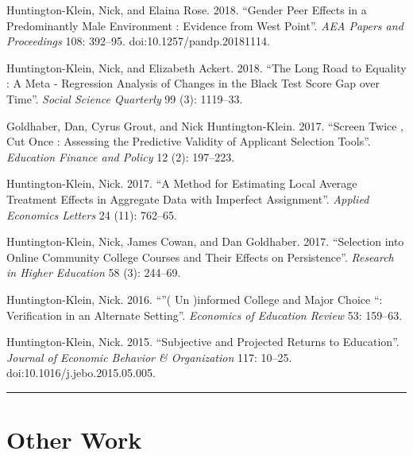 \documentclass[11pt,a4paper]{article}
\begin{document}
\begin{hangparas}{.25in}{1}

Huntington-Klein, Nick, and Elaina Rose. 2018. ``Gender Peer Effects in a Predominantly Male Environment : Evidence from West Point''. \emph{AEA Papers and Proceedings} 108: 392--95. doi:10.1257/pandp.20181114.



Huntington-Klein, Nick, and Elizabeth Ackert. 2018. ``The Long Road to Equality : A Meta - Regression Analysis of Changes in the Black Test Score Gap over Time''. \emph{Social Science Quarterly} 99 (3): 1119--33.



Goldhaber, Dan, Cyrus Grout, and Nick Huntington-Klein. 2017. ``Screen Twice , Cut Once : Assessing the Predictive Validity of Applicant Selection Tools''. \emph{Education Finance and Policy} 12 (2): 197--223.



Huntington-Klein, Nick. 2017. ``A Method for Estimating Local Average Treatment Effects in Aggregate Data with Imperfect Assignment''. \emph{Applied Economics Letters} 24 (11): 762--65.



Huntington-Klein, Nick, James Cowan, and Dan Goldhaber. 2017. ``Selection into Online Community College Courses and Their Effects on Persistence''. \emph{Research in Higher Education} 58 (3): 244--69.



Huntington-Klein, Nick. 2016. ``''( Un )informed College and Major Choice ``: Verification in an Alternate Setting''. \emph{Economics of Education Review} 53: 159--63.



Huntington-Klein, Nick. 2015. ``Subjective and Projected Returns to Education''. \emph{Journal of Economic Behavior \& Organization} 117: 10--25. doi:10.1016/j.jebo.2015.05.005.

 

\end{hangparas}

\vspace{1cm} \hrule \vspace{1cm}





\section*{Other Work} 
\end{document}
